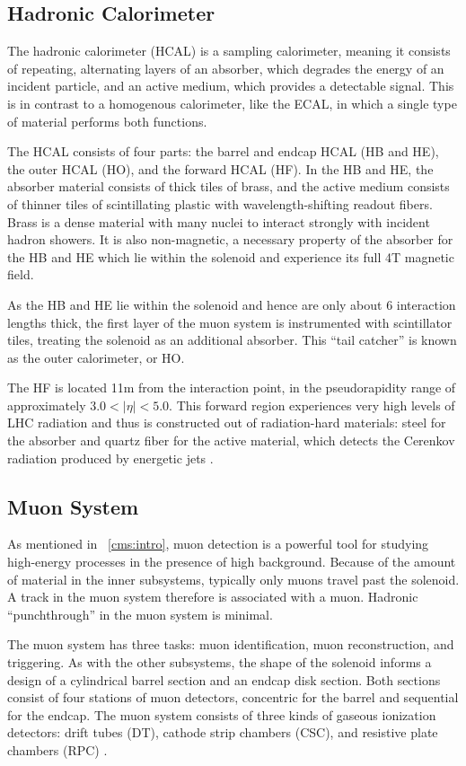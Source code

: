 \subsection{Hadronic Calorimeter}
The hadronic calorimeter (HCAL) is a sampling calorimeter, meaning it consists of repeating, alternating layers of an absorber, which degrades the energy of an incident particle, and an active medium, which provides a detectable signal.
This is in contrast to a homogenous calorimeter, like the ECAL, in which a single type of material performs both functions.

The HCAL consists of four parts: the barrel and endcap HCAL (HB and HE), the outer HCAL (HO), and the forward HCAL (HF).
In the HB and HE, the absorber material consists of thick tiles of brass, and the active medium consists of thinner tiles of scintillating plastic with wavelength-shifting readout fibers.
Brass is a dense material with many nuclei to interact strongly with incident hadron showers.
It is also non-magnetic, a necessary property of the absorber for the HB and HE which lie within the solenoid and experience its full 4\unit{T} magnetic field.

As the HB and HE lie within the solenoid and hence are only about 6 interaction lengths thick, the first layer of the muon system is instrumented with scintillator tiles, treating the solenoid as an additional absorber.
This ``tail catcher'' is known as the outer calorimeter, or HO.

The HF is located 11\unit{m} from the interaction point, in the pseudorapidity range of approximately $3.0 < |\eta| < 5.0$.
This forward region experiences very high levels of LHC radiation and thus is constructed out of radiation-hard materials: steel for the absorber and quartz fiber for the active material, which detects the Cerenkov radiation produced by energetic jets \cite{Chatrchyan:2008zzk, CERN-LHCC-97-031, Penzo2009}.

\subsection{Muon System}
As mentioned in \Sec~\ref{cms:intro}, muon detection is a powerful tool for studying high-energy processes in the presence of high background.
Because of the amount of material in the inner subsystems, typically only muons travel past the solenoid.
A track in the muon system therefore is associated with a muon.
Hadronic ``punchthrough'' in the muon system is minimal.

The muon system has three tasks: muon identification, muon reconstruction, and triggering.
As with the other subsystems, the shape of the solenoid informs a design of a cylindrical barrel section and an endcap disk section.
Both sections consist of four stations of muon detectors, concentric for the barrel and sequential for the endcap.
The muon system consists of three kinds of gaseous ionization detectors: drift tubes (DT), cathode strip chambers (CSC), and resistive plate chambers (RPC) \cite{Chatrchyan:2008zzk, CMS:1997dma}.

